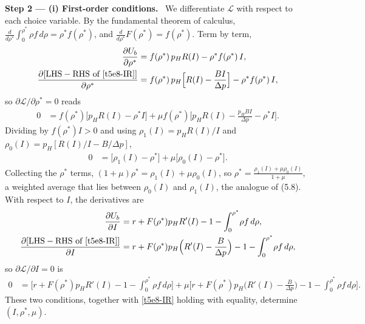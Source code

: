 \documentclass[11pt,a4paper]{article}
\newcommand{\step}[2]{\par\medskip\noindent\textbf{Step #1 --- #2.}~}
\begin{document}
\step{2}{(i) First-order conditions} We differentiate $\mathcal L$ with respect to each choice variable.
By the fundamental theorem of calculus, $\frac{d}{d\rho^*}\int_0^{\rho^*}\rho f\,d\rho=\rho^* f(\rho^*)$, and
$\frac{d}{d\rho^*}F(\rho^*)=f(\rho^*)$. Term by term,
\begin{align}
  \frac{\partial U_b}{\partial\rho^*} &= f(\rho^*)\,p_HR(I)-\rho^*f(\rho^*)\,I, \nonumber\\
  \frac{\partial[\text{LHS}-\text{RHS of }\eqref{t5e8-IR}]}{\partial\rho^*} &= f(\rho^*)\,p_H\Big[R(I)-\frac{BI}{\Delta p}\Big]-\rho^*f(\rho^*)\,I, \nonumber
\end{align}
so $\partial\mathcal L/\partial\rho^*=0$ reads
\begin{align}
  0 &= f(\rho^*)\big[p_HR(I)-\rho^*I\big] + \mu f(\rho^*)\Big[p_HR(I)-\frac{p_HBI}{\Delta p}-\rho^*I\Big]. \nonumber
\end{align}
Dividing by $f(\rho^*)I>0$ and using $\rho_1(I)=p_HR(I)/I$ and $\rho_0(I)=p_H[R(I)/I-B/\Delta p]$,
\begin{align}
  0 &= \big[\rho_1(I)-\rho^*\big] + \mu\big[\rho_0(I)-\rho^*\big]. \label{t5e8-focrho}
\end{align}
Collecting the $\rho^*$ terms, $(1+\mu)\rho^*=\rho_1(I)+\mu\rho_0(I)$, so
$\rho^*=\frac{\rho_1(I)+\mu\rho_0(I)}{1+\mu}$, a weighted average that lies between $\rho_0(I)$ and $\rho_1(I)$,
the analogue of (5.8). With respect to $I$, the derivatives are
\begin{align}
  \frac{\partial U_b}{\partial I} &= r+F(\rho^*)p_HR'(I)-1-\int_0^{\rho^*}\!\rho f\,d\rho, \nonumber\\
  \frac{\partial[\text{LHS}-\text{RHS of }\eqref{t5e8-IR}]}{\partial I} &= r+F(\rho^*)p_H\Big(R'(I)-\frac{B}{\Delta p}\Big)-1-\int_0^{\rho^*}\!\rho f\,d\rho, \nonumber
\end{align}
so $\partial\mathcal L/\partial I=0$ is
\begin{align}
  0 &= \Big[r+F(\rho^*)p_HR'(I)-1-\int_0^{\rho^*}\!\rho f\,d\rho\Big]
       + \mu\Big[r+F(\rho^*)p_H\Big(R'(I)-\frac{B}{\Delta p}\Big)-1-\int_0^{\rho^*}\!\rho f\,d\rho\Big]. \label{t5e8-focI}
\end{align}
These two conditions, together with \eqref{t5e8-IR} holding with equality, determine $(I,\rho^*,\mu)$.
\end{document}
